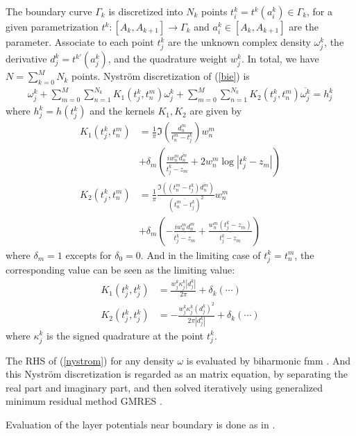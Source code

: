 \documentclass[10pt,twocolumn]{article}
\begin{document}
The boundary curve $\Gamma_k$ is discretized into $N_k$ points $t^k_i = t^k(a^k_i)\in \Gamma_k$, 
for a given parametrization $t^k: [A_k,A_{k+1}] \to \Gamma_k$ and $a^k_i\in [A_k, A_{k+1}]$ are the parameter. 
Associate to each point $t^k_j$ are the unknown complex density $\omega^k_j$, 
the derivative $d^k_j = t^{k\prime}(a^k_j)$, 
and the quadrature weight $w^k_j$. In total, we have $N= \sum_{k=0}^M N_k$ points. Nystr\"om discretization of (\ref{bie}) is
\begin{align}
  \omega_j^k 
  + \sum_{m=0}^{M}\sum_{n=1}^{N_k} K_1(t^k_j,t^m_n) \omega^k_j 
  + \sum_{m=0}^{M}\sum_{n=1}^{N_k} K_2(t^k_j,t^m_n) \overline{\omega^k_j} = h^k_j
  \label{nystrom}
\end{align} where $h^k_j = h(t^k_j)$ and the kernels $K_1, K_2$ are given by 
\begin{align}
  K_1(t^k_j, t^m_n) 
  &= \frac{1}{\pi} \Im (\frac{d^m_n}{t^m_n-t^k_j})w^m_n \\
  &+ \delta_m\left(\frac{iw^m_n\overline{d^m_n}}{\overline{t^k_j - z_m}}
  + 2w^m_n \log |t^k_j - z_m| \right)\nonumber \\
  K_2(t^k_j, t^m_n) 
  &= \frac{1}{\pi} \frac{\Im((t^m_n-t^k_j)\overline{d^m_n})}{(\overline{t^m_n - t^k_j})^2} w^m_n  \\
  & + \delta_{m} \left(- \frac{iw^m_n d^m_n}{\overline{t^k_j - z_m}} + \frac{w^m_n(t^k_j-z_m)}{\overline{t^k_j - z_m}}\right) \nonumber
\end{align}
where $\delta_m = 1$ excepts for $\delta_0 = 0$. And in the limiting case of $t^k_j = t^m_n$, the corresponding value can be seen as the limiting value:
\begin{align}
  K_1(t^k_j, t^k_j) &= \frac{w^k_j \kappa^k_j|d^k_j|}{2\pi} + \delta_{k}(\cdots)\\
  K_2(t^k_j, t^k_j) &= -\frac{w^k_j\kappa^k_j(d^k_j)^2}{2\pi|d^k_j|} + \delta_k(\cdots)
\end{align}where $\kappa^k_j$ is the signed quadrature at the point $t^k_j$. 

The RHS of (\ref{nystrom}) for any density $\omega$ is evaluated by biharmonic fmm 
\cite{FlatironinstituteFmm2d2022}. 
And this Nystr\"om discretization is regarded as an matrix equation, 
by separating the real part and imaginary part, 
and then solved iteratively using 
generalized minimum residual method GMRES \cite{saadGMRESGeneralizedMinimal1986}. 

Evaluation of the layer potentials near boundary is done as in \cite{wuSolutionStokesFlow2020}. 
\end{document}
